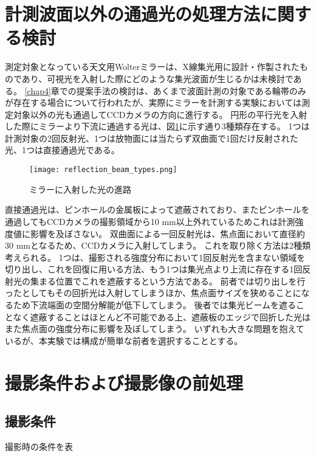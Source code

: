 \section{計測波面以外の通過光の処理方法に関する検討}
測定対象となっている天文用Wolterミラーは、X線集光用に設計・作製されたものであり、可視光を入射した際にどのような集光波面が生じるかは未検討である。
\ref{chap4}章での提案手法の検討は、あくまで波面計測の対象である輪帯のみが存在する場合について行われたが、実際にミラーを計測する実験においては測定対象以外の光も通過してCCDカメラの方向に進行する。
円形の平行光を入射した際にミラーより下流に通過する光は、図\ref{fig:mirror_beam_path_types}に示す通り3種類存在する。
1つは計測対象の2回反射光、1つは放物面には当たらず双曲面で1回だけ反射された光、1つは直接通過光である。

\begin{figure}[!ht]
\centering
\texttt{[image: reflection\_beam\_types.png]}
\caption{ミラーに入射した光の進路}
\label{fig:mirror_beam_path_types}
\end{figure}

直接通過光は、ピンホールの金属板によって遮蔽されており、またピンホールを通過してもCCDカメラの撮影領域から10 mm以上外れているためこれは計測強度値に影響を及ぼさない。
双曲面による一回反射光は、焦点面において直径約30 mmとなるため、CCDカメラに入射してしまう。
これを取り除く方法は2種類考えられる。
1つは、撮影される強度分布において1回反射光を含まない領域を切り出し、これを回復に用いる方法、もう1つは集光点より上流に存在する1回反射光の集まる位置でこれを遮蔽するという方法である。
前者では切り出しを行ったとしてもその回折光は入射してしまうほか、焦点面サイズを狭めることになるため下流端面の空間分解能が低下してしまう。
後者では集光ビームを遮ることなく遮蔽することはほとんど不可能である上、遮蔽板のエッジで回折した光はまた焦点面の強度分布に影響を及ぼしてしまう。
いずれも大きな問題を抱えているが、本実験では構成が簡単な前者を選択することとする。


\clearpage
\newpage

\section{撮影条件および撮影像の前処理}

\subsection{撮影条件}
撮影時の条件を表

